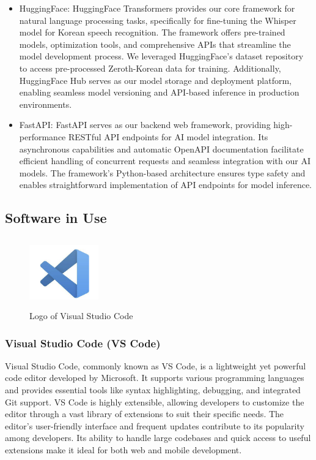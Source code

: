 \begin{itemize}
                \item HuggingFace: HuggingFace Transformers provides our core framework for natural language processing tasks, specifically for fine-tuning the Whisper model for Korean speech recognition. The framework offers pre-trained models, optimization tools, and comprehensive APIs that streamline the model development process. We leveraged HuggingFace's dataset repository to access pre-processed Zeroth-Korean data for training. Additionally, HuggingFace Hub serves as our model storage and deployment platform, enabling seamless model versioning and API-based inference in production environments.

                \item FastAPI: FastAPI serves as our backend web framework, providing high-performance RESTful API endpoints for AI model integration. Its asynchronous capabilities and automatic OpenAPI documentation facilitate efficient handling of concurrent requests and seamless integration with our AI models. The framework's Python-based architecture ensures type safety and enables straightforward implementation of API endpoints for model inference.
            \end{itemize}

            \subsection{Software in Use}
        \begin{figure}[htbp]
            \centerline{\includegraphics[width=3cm, height=3cm]{Images/logo/vsc.png}}
            \caption{Logo of Visual Studio Code}
            \label{fig}
        \end{figure}
        \subsubsection{Visual Studio Code (VS Code)}
            Visual Studio Code, commonly known as VS Code, is a lightweight yet powerful code editor developed by Microsoft. It supports various programming languages and provides essential tools like syntax highlighting, debugging, and integrated Git support. VS Code is highly extensible, allowing developers to customize the editor through a vast library of extensions to suit their specific needs. The editor's user-friendly interface and frequent updates contribute to its popularity among developers. Its ability to handle large codebases and quick access to useful extensions make it ideal for both web and mobile development.

